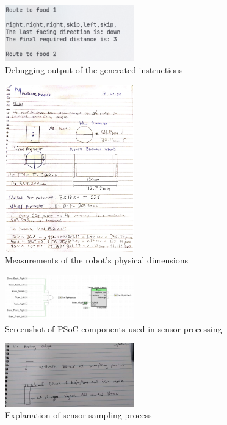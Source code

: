 \documentclass[conference]{IEEEtran}
\begin{document}
\begin{figure}[htbp]
	\centerline{\includegraphics[width=0.5\textwidth]{pathfinding-instructions.png}}
	\caption{Debugging output of the generated instructions}
	\label{fig:pathfinding-instructions}
\end{figure}

\begin{figure}[htbp]
	\centerline{\includegraphics[width=0.5\textwidth]{physical-measurements.png}}
	\caption{Measurements of the robot's physical dimensions}
	\label{fig:physical-dimensions}
\end{figure}

\begin{figure}[htbp]
	\centerline{\includegraphics[width=0.5\textwidth]{sensor-psoc.png}}
	\caption{Screenshot of PSoC components used in sensor processing}
	\label{fig:sensor-psoc}
\end{figure}

\begin{figure}[htbp]
	\centerline{\includegraphics[width=0.5\textwidth]{sensor-sampling.png}}
	\caption{Explanation of sensor sampling process}
	\label{fig:sensor-sampling}
\end{figure}
\end{document}
